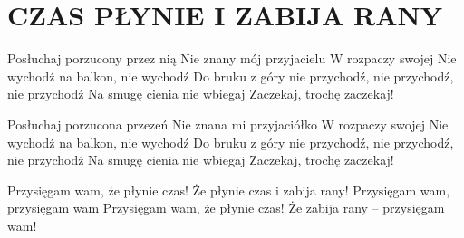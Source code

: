 \documentclass[../../../songbook.tex]{subfiles}
\begin{document}
\TabPositions{8cm} %
\section*{CZAS PŁYNIE I ZABIJA RANY}
{}
\vspace{0.5cm}

Posłuchaj porzucony przez nią					 \newline
Nie znany mój przyjacielu						 \newline
W rozpaczy swojej								 \newline
Nie wychodź na balkon, nie wychodź				 \newline
Do bruku z góry nie przychodź, nie przychodź, nie przychodź	 \newline
Na smugę cienia nie wbiegaj									 \newline
Zaczekaj, trochę zaczekaj!									 \newline

Posłuchaj porzucona przezeń					 \newline	
Nie znana mi przyjaciółko					 \newline
W rozpaczy swojej							 \newline
Nie wychodź na balkon, nie wychodź			\newline
Do bruku z góry nie przychodź, nie przychodź, nie przychodź	 \newline
Na smugę cienia nie wbiegaj						 \newline
Zaczekaj, trochę zaczekaj!					 \newline

Przysięgam wam, że płynie czas!		 \newline
Że płynie czas i zabija rany!		 \newline
Przysięgam wam, przysięgam wam		 \newline
Przysięgam wam, że płynie czas!		 \newline
Że zabija rany – przysięgam wam!	 \newline
\end{document}
